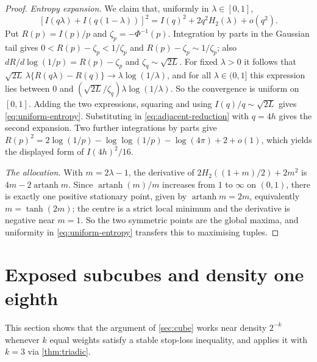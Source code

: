 \documentclass[11pt,a4paper]{article}
\numberwithin{equation}{section}
\theoremstyle{remark}
\begin{document}
\begin{proof}
\emph{Entropy expansion.} We claim that, uniformly in $\lambda\in[0,1]$,
\begin{equation}\label{eq:uniform-entropy}
 [I(q\lambda)+I(q(1-\lambda))]^2=I(q)^2+2q^2H_2(\lambda)+o(q^2).
\end{equation}
Put $R(p)=I(p)/p$ and $\zeta_p=-\Phi^{-1}(p)$. Integration by parts in the
Gaussian tail gives $0<R(p)-\zeta_p<1/\zeta_p$ and
$R(p)-\zeta_p\sim1/\zeta_p$; also $dR/d\log(1/p)=R(p)-\zeta_p$ and
$\zeta_q\sim\sqrt{2L}$. For fixed $\lambda>0$ it follows that
$\sqrt{2L}\,\lambda\{R(q\lambda)-R(q)\}\to\lambda\log(1/\lambda)$, and for
all $\lambda\in(0,1]$ this expression lies between $0$ and
$(\sqrt{2L}/\zeta_q)\lambda\log(1/\lambda)$. So the convergence is uniform
on $[0,1]$. Adding the two expressions, squaring and using
$I(q)/q\sim\sqrt{2L}$ gives \eqref{eq:uniform-entropy}. Substituting in
\eqref{eq:adjacent-reduction} with $q=4h$ gives the second expansion.
Two further integrations by parts give
$R(p)^2=2\log(1/p)-\log\log(1/p)-\log(4\pi)+2+o(1)$, which yields the
displayed form of $I(4h)^2/16$.

\emph{The allocation.} With $m=2\lambda-1$, the derivative of
$2H_2((1+m)/2)+2m^2$ is $4m-2\operatorname{artanh}m$. Since
$\operatorname{artanh}(m)/m$ increases from $1$ to $\infty$ on $(0,1)$,
there is exactly one positive stationary point, given by
$\operatorname{artanh}m=2m$, equivalently $m=\tanh(2m)$; the centre is a
strict local minimum and the derivative is negative near $m=1$. So the two
symmetric points are the global maxima, and uniformity in
\eqref{eq:uniform-entropy} transfers this to maximising tuples.
\end{proof}

\section{Exposed subcubes and density one eighth}\label{sec:faces}

This section shows that the argument of \cref{sec:cube} works near
density $2^{-k}$ whenever $k$ equal weights satisfy a stable stop-loss
inequality, and applies it with $k=3$ via \cref{thm:triadic}.
\end{document}
